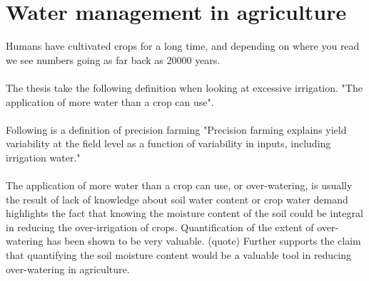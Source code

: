 \documentclass[]{uiophd}
\begin{document}
\section{Water management in agriculture}
Humans have cultivated crops for a long time, and depending on where you read we see numbers going as far back as 20000 years. \cite{10.1371/journal.pone.0131422} 
\\\\
The thesis take the following definition when looking at excessive irrigation. "The application of more water than a crop can use". \cite{LILIENFELD200773}
\\\\
Following is a definition of precision farming "Precision farming explains yield variability at the field level as a function of variability in inputs, including irrigation water."\cite{LILIENFELD200773}
\\\\

The application of more water than a crop can use, or over-watering, is usually the result of lack of knowledge about soil water content or crop water demand \cite{LILIENFELD200773} highlights the fact that knowing the moisture content of the soil could be integral in reducing the over-irrigation of crops. Quantification of the extent of over-watering has been shown to be very valuable. (quote) Further supports the claim that quantifying the soil moisture content would be a valuable tool in reducing over-watering in agriculture.
\end{document}
